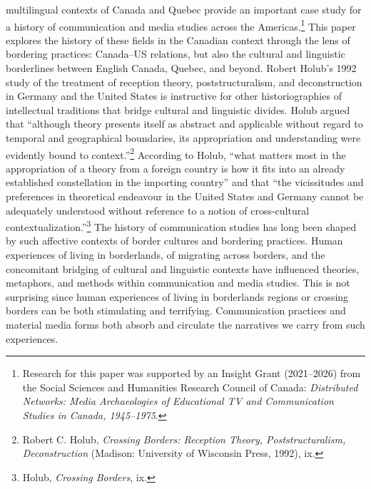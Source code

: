 \documentclass{tufte-handout}
\begin{document}
 multilingual contexts of Canada and Quebec provide
an important case study for a history of communication and media studies
across the Americas.\footnote{Research for this paper was supported by
  an Insight Grant (2021--2026) from the Social Sciences and Humanities
  Research Council of Canada: \emph{Distributed Networks: Media
  Archaeologies of Educational TV and Communication Studies in Canada,
  1945--1975}.} This paper explores the history of these fields in the
Canadian context through the lens of bordering practices: Canada--US
relations, but also the cultural and linguistic borderlines between
English Canada, Quebec, and beyond. Robert Holub's 1992 study of the
treatment of reception theory, poststructuralism, and deconstruction in
Germany and the United States is instructive for other historiographies
of intellectual traditions that bridge cultural and linguistic divides.
Holub argued that ``although theory presents itself as abstract and
applicable without regard to temporal and geographical boundaries, its
appropriation and understanding were evidently bound to
context.''\footnote{Robert C. Holub, \emph{Crossing Borders: Reception
  Theory, Poststructuralism, Deconstruction} (Madison: University of
  Wisconsin Press, 1992), ix.} According to Holub, ``what matters most
in the appropriation of a theory from a foreign country is how it fits
into an already established constellation in the importing country'' and
that ``the vicissitudes and preferences in theoretical endeavour in the
United States and Germany cannot be adequately understood without
reference to a notion of cross-cultural contextualization.''\footnote{Holub,
  \emph{Crossing Borders}, ix.} The history of communication studies has
long been shaped by such affective contexts of border cultures and
bordering practices. Human experiences of living in borderlands, of
migrating across borders, and the concomitant bridging of cultural and
linguistic contexts have influenced theories, metaphors, and methods
within communication and media studies. This is not surprising since
human experiences of living in borderlands regions or crossing borders
can be both stimulating and terrifying. Communication practices and
material media forms both absorb and circulate the narratives we carry
from such experiences.
\end{document}
